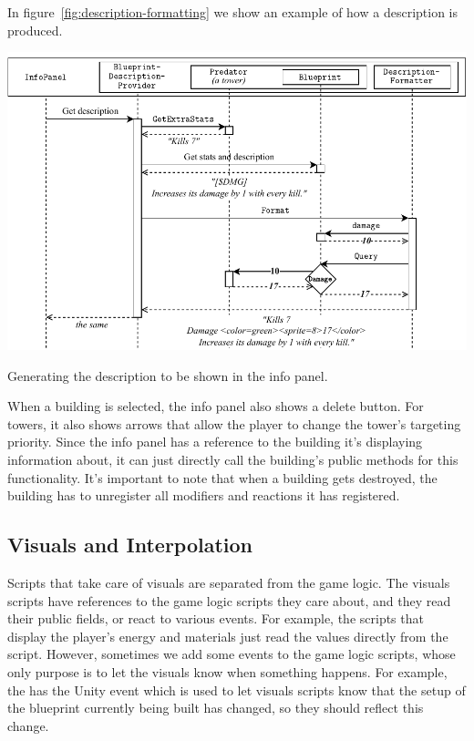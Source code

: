 In figure~\ref{fig:description-formatting} we show an example of how a description is produced.

\begin{center}
    \captionsetup{type=figure}
    \includegraphics[width=\textwidth]{img/description formatting.pdf}
    \caption{Generating the description to be shown in the info panel.}
    \label{fig:description-formatting}
\end{center}

When a building is selected, the info panel also shows a delete button.
For towers, it also shows arrows that allow the player to change the tower's targeting priority.
Since the info panel has a reference to the building it's displaying information about, it can just directly call the building's public methods for this functionality.
It's important to note that when a building gets destroyed, the building has to unregister all modifiers and reactions it has registered.

\subsection{Visuals and Interpolation}

Scripts that take care of visuals are separated from the game logic.
The visuals scripts have references to the game logic scripts they care about, and they read their public fields, or react to various events.
For example, the scripts that display the player's energy and materials just read the values directly from the  script.
However, sometimes we add some events to the game logic scripts, whose only purpose is to let the visuals know when something happens.
For example, the  has the Unity event  which is used to let visuals scripts know that the setup of the blueprint currently being built has changed, so they should reflect this change.

